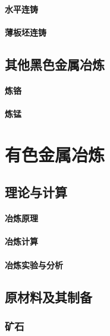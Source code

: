 \documentclass[UTF8]{../../ApplicationUniverse}
\begin{document}
        \subsubsection{水平连铸}
        \subsubsection{薄板坯连铸}
\section{其他黑色金属冶炼}
    \subsubsection{炼铬}
    \subsubsection{炼锰}

















\chapter{有色金属冶炼}
\section{理论与计算}
    \subsubsection{冶炼原理}
    \subsubsection{冶炼计算}
    \subsubsection{冶炼实验与分析}
\section{原材料及其制备}
    \subsection{矿石}
\end{document}
